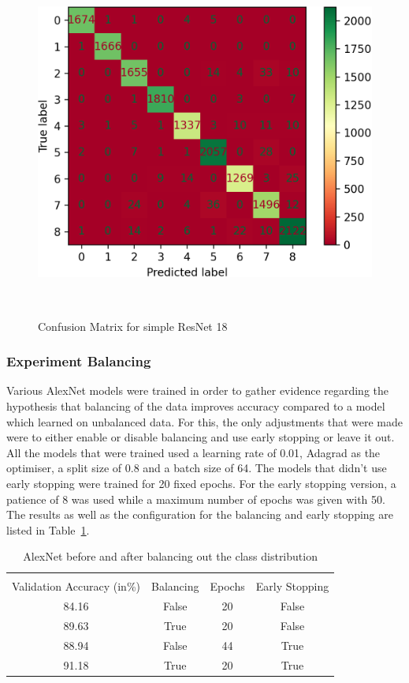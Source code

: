 \begin{figure}[ht]
	\centering
	\includegraphics[scale=0.75]{./figures/model_1_no_balancing_conf_matrix_cropped.png}
	\caption{Confusion Matrix for simple ResNet 18}~\label{fig:res18-confmatrix}
\end{figure}


\subsubsection{Experiment Balancing}\label{balancingexperiment}
Various AlexNet models were trained in order to gather evidence regarding the hypothesis that balancing of the data improves accuracy compared to a model which learned on unbalanced data. For this, the only adjustments that were made were to either enable or disable balancing and use early stopping or leave it out. All the models that were trained used a learning rate of 0.01, Adagrad as the optimiser, a split size of 0.8 and a batch size of 64. The models that didn't use early stopping were trained for 20 fixed epochs. For the early stopping version, a patience of 8 was used while a maximum number of epochs was given with 50. The results as well as the configuration for the balancing and early stopping are listed in Table~\ref{balancing-table}. 

\begin{table}[ht]
	\caption{AlexNet before and after balancing out the class distribution}\label{balancing-table}
	\centering
	\begin{tabular}{cccc}
		\toprule
		\multicolumn{3}{c}{} \\
		Validation Accuracy (in\%)    & Balancing     & Epochs    &Early Stopping     \\
		\midrule
		84.16    &    False    & 20    & False \\
		89.63    &    True    & 20    & False  \\
		88.94    &    False   & 44    & True \\
		91.18    &    True    & 20    & True \\
		\bottomrule
	\end{tabular}
\end{table}

